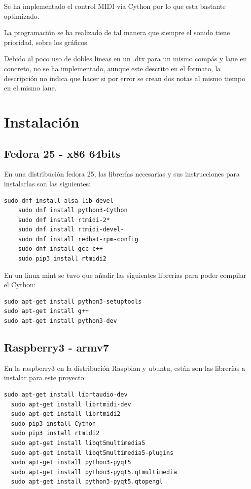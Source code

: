 \documentclass[a4paper,11pt,oneside]{book}
\begin{document}
Se ha implementado el control MIDI vía Cython por lo que esta bastante optimizado.

La programación se ha realizado de tal manera que siempre el sonido tiene prioridad, sobre los gráficos.

Debido al poco uso de dobles lineas en un .dtx para un mismo compás y lane en concreto, no se ha implementado, aunque este descrito en el formato, la descripción no indica que hacer si por error se crean dos notas al mismo tiempo en el mismo lane.

\section{Instalación}

\subsection{Fedora 25 - x86 64bits}
En una distribución fedora 25, las librerías necesarias y sus instrucciones para instalarlas son las siguientes:

\begin{Verbatim}[frame=single]
    sudo dnf install alsa-lib-devel  
    sudo dnf install python3-Cython 
    sudo dnf install rtmidi-2*
    sudo dnf install rtmidi-devel-
    sudo dnf install redhat-rpm-config  
    sudo dnf install gcc-c++
    sudo pip3 install rtmidi2
\end{Verbatim}

En un linux mint se tuvo que añadir las siguientes librerías para poder compilar el Cython:

\begin{Verbatim}[frame=single]
sudo apt-get install python3-setuptools
sudo apt-get install g++
sudo apt-get install python3-dev
\end{Verbatim}


\subsection{Raspberry3 - armv7}

En la raspberry3 en la distribución Raspbian y ubuntu, están son las librerías a instalar para este proyecto:

\begin{Verbatim}[frame=single]
  sudo apt-get install librtaudio-dev
  sudo apt-get install librtmidi-dev
  sudo apt-get install librtmidi2   
  sudo pip3 install Cython 
  sudo pip3 install rtmidi2
  sudo apt-get install libqt5multimedia5
  sudo apt-get install libqt5multimedia5-plugins
  sudo apt-get install python3-pyqt5
  sudo apt-get install python3-pyqt5.qtmultimedia
  sudo apt-get install python3-pyqt5.qtopengl  
\end{Verbatim}
\end{document}
